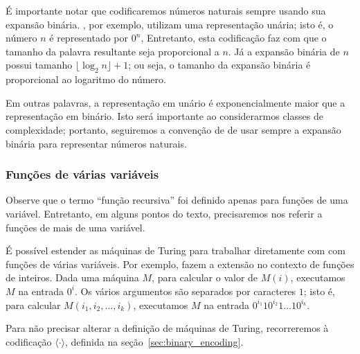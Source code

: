 
É importante notar que codificaremos números naturais
sempre usando sua expansão binária.
,
por exemplo,
utilizam uma representação unária;
isto é, o número $n$ é representado por $0^n$,
Entretanto,
esta codificação faz com que o tamanho da palavra resultante
seja proporcional a $n$.
Já a expansão binária de $n$ possui tamanho $\lfloor \log_2 n \rfloor + 1$;
ou seja, o tamanho da expansão binária é proporcional ao logaritmo do número.

Em outras palavras,
a representação em unário é exponencialmente maior que a representação em binário.
Isto será importante ao considerarmos classes de complexidade;
portanto,
seguiremos a convenção de 
de usar sempre a expansão binária para representar números naturais.

\subsubsection{Funções de várias variáveis}

Observe que o termo ``função recursiva''
foi definido apenas para funções de uma variável.
Entretanto,
em alguns pontos do texto,
precisaremos nos referir a funções de mais de uma variável.

É possível estender as máquinas de Turing
para trabalhar diretamente com com funções de várias variáveis.
Por exemplo, 
fazem a extensão no contexto de funções de inteiros.
Dada uma máquina $M$,
para calcular o valor de $M(i)$,
executamos $M$ na entrada $0^i$.
Os vários argumentos são separados por caracteres $1$;
isto é, para calcular $M(i_1, i_2, \dots, i_k)$,
executamos $M$ na entrada $0^{i_1} 1 0^{i_2} 1 \dots 1 0^{i_k}$.

Para não precisar alterar a definição de máquinas de Turing,
recorreremos à codificação $\langle \cdot \rangle$,
definida na seção~\ref{sec:binary_encoding}.

